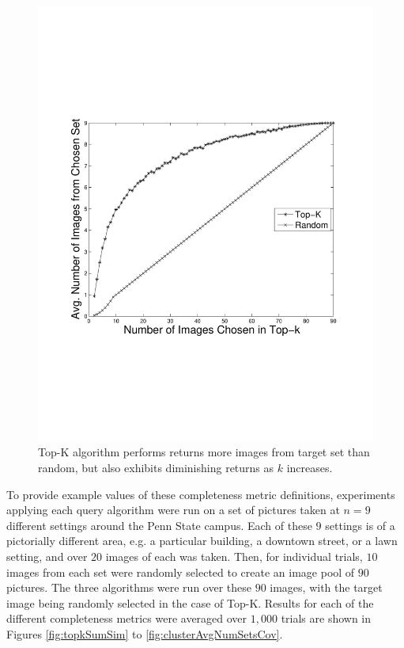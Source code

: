 \begin{figure} 
\centering
    \includegraphics[clip=true, trim = 15mm 65mm 20mm 70mm, scale=0.35]{figures/topk/avg_num_matching.pdf}
    \vspace{-3mm}
    \caption{Top-K algorithm performs returns more images from target set than random, but also exhibits diminishing returns as $k$ increases.}
    \label{fig:topkAvgNumSameSet}
    \vspace{-6mm}
\end{figure}

To provide example values of these completeness metric definitions, experiments applying each query algorithm were run on a set of pictures taken at $n = 9$ different settings around the Penn State campus.  Each of these $9$ settings is of a pictorially different area, e.g. a particular building, a downtown street, or a lawn setting, and over $20$ images of each was taken.  Then, for individual trials, $10$ images from each set were randomly selected to create an image pool of $90$ pictures.  The three algorithms were run over these $90$ images, with the target image being randomly selected in the case of Top-K.  Results for each of the different completeness metrics were averaged over $1,000$ trials are shown in Figures \ref{fig:topkSumSim} to \ref{fig:clusterAvgNumSetsCov}.

